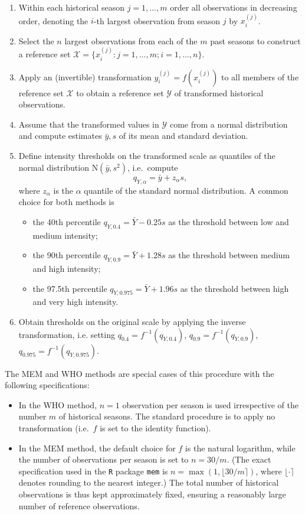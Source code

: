\documentclass{article}
\newcommand{\sd}{s}
\newcommand{\mean}{\bar{Y}}
\begin{document}
\begin{enumerate}
\item Within each historical season $j = 1, \dots, m$ order all observations in decreasing order, denoting the $i$-th largest observation from season $j$ by $x^{(j)}_i$.
\item Select the $n$ largest observations from each of the $m$ past seasons to construct a reference set $\mathcal{X} = \{x_i^{(j)}: j = 1, \dots, m; i = 1, \dots, n\}$.
\item Apply an (invertible) transformation $y_i^{(j)} = f(x_i^{(j)})$ to all members of the reference set $\mathcal{X}$ to obtain a reference set $\mathcal{Y}$ of transformed historical observations.
\item Assume that the transformed values in $\mathcal{Y}$ come from a normal distribution and compute estimates $\bar{y}, \sd$ of its mean and standard deviation.
\item Define intensity thresholds on the transformed scale as quantiles of the normal distribution N$(\bar{y}, \sd^2)$, i.e.\ compute
\begin{equation}
q_{Y, \alpha} = \bar{y} + z_\alpha \sd, \label{eq:def_q}
\end{equation}
where $z_\alpha$ is the $\alpha$ quantile of the standard normal distribution. A common choice for both methods is
\begin{itemize}
\item the 40th percentile $q_{Y, 0.4} = \mean - 0.25 \sd$ as the threshold between low and medium intensity;
\item the 90th percentile $q_{Y, 0.9} = \mean + 1.28 \sd$ as the threshold between medium and high intensity;
\item the 97.5th percentile $q_{Y, 0.975} = \mean + 1.96\sd$ as the threshold between high and very high intensity.
\end{itemize}
\item Obtain thresholds on the original scale by applying the inverse transformation, i.e. setting $q_{0.4} = f^{-1}(q_{Y, 0.4})$, $q_{0.9} = f^{-1}(q_{Y, 0.9})$, $q_{0.975} = f^{-1}(q_{Y, 0.975})$.
\end{enumerate}

\noindent The MEM and WHO methods are special cases of this procedure with the following specifications:
\begin{itemize}
\item In the WHO method, $n = 1$ observation per season is used irrespective of the number $m$ of historical seasons. The standard procedure is to apply no transformation (i.e.\ $f$ is set to the identity function).
\item In the MEM method, the default choice for $f$ is the natural logarithm, while the number of observations per season is set to $n = 30/m$. (The exact specification used in the \texttt{R} package \texttt{mem} is $n = \max(1, \lfloor 30/m \rceil)$, where $\lfloor \cdot \rceil$ denotes rounding to the nearest integer.) The total number of historical observations is thus kept approximately fixed, ensuring a reasonably large number of reference observations.
\end{itemize}
\end{document}
